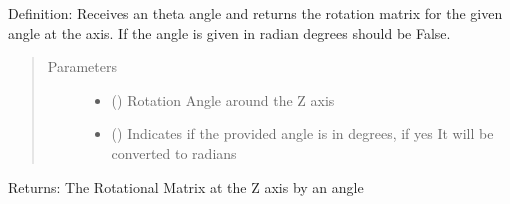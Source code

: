 \documentclass[letterpaper,10pt,english]{sphinxmanual}
\begin{document}

\begin{fulllineitems}
\label{\detokenize{rst/Example_6:Example_6.T_rot_z}}
Definition: Receives an theta angle and returns the rotation matrix for the given angle at the  axis.
If the angle is given in radian degrees should be False.
\begin{quote}\begin{description}
\item[{Parameters}] \leavevmode\begin{itemize}
\item {} 
 () \textendash{} Rotation Angle around the Z axis

\item {} 
 () \textendash{} Indicates if the provided angle is in degrees, if yes It will be converted to radians

\end{itemize}

\end{description}\end{quote}

Returns: The Rotational Matrix at the Z axis by an  angle

\end{fulllineitems}

\end{document}
